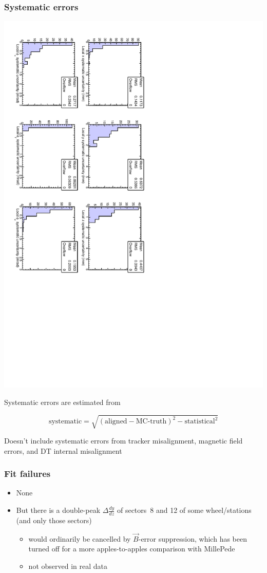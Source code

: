 \documentclass[compress]{beamer}
\begin{document}
\begin{frame}
\frametitle{Systematic errors}
\includegraphics[height=\linewidth, angle=90]{hip_MCsystematic.pdf}

\scriptsize

\vfill Systematic errors are estimated from

\[ \mbox{systematic} = \sqrt{(\mbox{aligned} - \mbox{MC-truth})^2 - \mbox{statistical}^2} \]

\vfill Doesn't include systematic errors from tracker misalignment, magnetic field errors, and DT internal misalignment
\end{frame}

\begin{frame}
\frametitle{Fit failures}

\begin{itemize}
\item None
\item But there is a double-peak $\Delta \frac{dy}{dz}$ of sectors~8 and 12 of some wheel/stations (and only those sectors)
\begin{itemize}
\item would ordinarily be cancelled by $\vec{B}$-error suppression, which has been turned off for a more apples-to-apples comparison with MillePede
\item not observed in real data
\end{itemize}
\end{itemize}

\end{frame}
\end{document}
